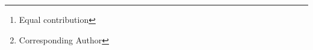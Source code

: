 \author{Mingxuan Yan\thanks{Equal contribution} \qquad Ruijie Zhang\footnotemark[1] \qquad Xuedou Xiao \qquad Wei Wang\thanks{Corresponding Author} \\
Huazhong University of Science and Technology\\
}